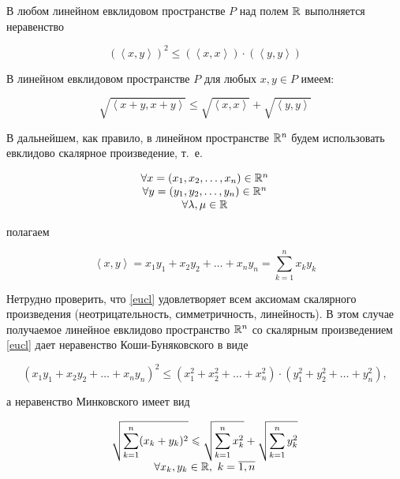 \documentclass[../main.tex]{subfiles}
\begin{document}
\begin{thm}
 В любом линейном евклидовом пространстве $P$ над полем $\mathbb{R}$
 выполняется неравенство
 
 \begin{equation}
  \label{kosh-bun}
  (\left<x, y\right>)^2 \leq \left(\left<x, x\right>\right) 
  \cdot \left(\left<y, y\right>\right)
 \end{equation}
\end{thm}
\begin{crl*}
 В линейном евклидовом пространстве $P$ для любых $x, y \in P$ имеем:
 
 \begin{equation}
  \label{mink}
  \sqrt{\left<x+y, x+y\right>} \le
  \sqrt{\left<x, x\right>} + \sqrt{\left<y, y\right>}
 \end{equation}

\end{crl*}
\begin{rem}
 В дальнейшем, как правило, в линейном пространстве $\mathbb{R}^n$ будем 
 использовать евклидово скалярное произведение, т.~е.

 \[
 \begin{array}{c}
  \forall x = (x_1, x_2, \dots, x_n) \in \mathbb{R}^n \\
  \forall y = (y_1, y_2, \dots, y_n) \in \mathbb{R}^n \\
  \forall \lambda, \mu \in \mathbb{R}
 \end{array}
 \]
 
 полагаем
 
 \begin{equation}
  \label{eucl}
  \left<x, y\right> = x_1y_1 + x_2y_2 + \dots + x_ny_n =
  \sum_{k=1}^n x_ky_k
 \end{equation}

 Нетрудно проверить, что \eqref{eucl} удовлетворяет всем аксиомам 
 скалярного произведения (неотрицательность, симметричность, 
 линейность). В этом случае получаемое линейное евклидово пространство
 $\mathbb{R}^n$ со скалярным произведением \eqref{eucl} дает неравенство
 Коши-Буняковского в виде
 
 \begin{equation}
  \label{kosh-bun.e}
  \left(x_1y_1 + x_2y_2 + \dots + x_ny_n\right)^2 \le
  \left(x_1^2 + x_2^2 + \dots + x_n^2\right)\cdot
  \left(y_1^2 + y_2^2 + \dots + y_n^2\right),
 \end{equation}
 
 а неравенство Минковского имеет вид
 
 \begin{equation}
  \label{mink.e}
  \begin{array}{c}
   \displaystyle
   \sqrt{\sum_{k=1}^n (x_k + y_k)^2} \leqslant
   \sqrt{\sum_{k=1}^n x_k^2} + \sqrt{\sum_{k=1}^n y_k^2} \\
   \forall x_k, y_k \in \mathbb{R},\ k = \overline{1, n}
  \end{array}
 \end{equation}
 
\end{rem}
\end{document}
